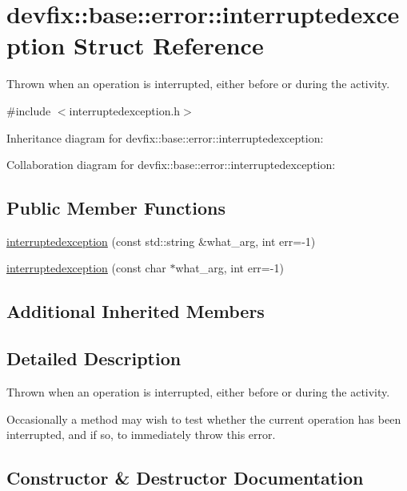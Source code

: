 \hypertarget{structdevfix_1_1base_1_1error_1_1interruptedexception}{}\section{devfix\+:\+:base\+:\+:error\+:\+:interruptedexception Struct Reference}
\label{structdevfix_1_1base_1_1error_1_1interruptedexception}


Thrown when an operation is interrupted, either before or during the activity.  




{\ttfamily \#include $<$interruptedexception.\+h$>$}



Inheritance diagram for devfix\+:\+:base\+:\+:error\+:\+:interruptedexception\+:


Collaboration diagram for devfix\+:\+:base\+:\+:error\+:\+:interruptedexception\+:
\subsection*{Public Member Functions}
\begin{DoxyCompactItemize}
\item 
\hyperlink{structdevfix_1_1base_1_1error_1_1interruptedexception_a9b2d1244ef3e3029d231be8b84fa4c16}{interruptedexception} (const std\+::string \&what\+\_\+arg, int err=-\/1)
\item 
\hyperlink{structdevfix_1_1base_1_1error_1_1interruptedexception_a244a67233ab2b7be511706d8398ed860}{interruptedexception} (const char $\ast$what\+\_\+arg, int err=-\/1)
\end{DoxyCompactItemize}
\subsection*{Additional Inherited Members}


\subsection{Detailed Description}
Thrown when an operation is interrupted, either before or during the activity. 

Occasionally a method may wish to test whether the current operation has been interrupted, and if so, to immediately throw this error. 

\subsection{Constructor \& Destructor Documentation}
\mbox{\label{structdevfix_1_1base_1_1error_1_1interruptedexception_a9b2d1244ef3e3029d231be8b84fa4c16}} 
